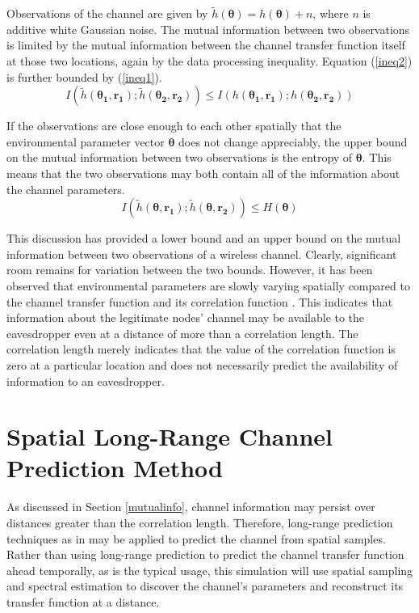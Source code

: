 \documentclass{allertonproc}
\begin{document}
Observations of the channel are given by $\tilde{h}(\boldsymbol{\theta})=h(\boldsymbol{\theta})+n$, where $n$ is additive white Gaussian noise.  The mutual information between two observations is limited by the mutual information between the channel transfer function itself at those two locations, again by the data processing inequality.  Equation (\ref{ineq2}) is further bounded by (\ref{ineq1}).
\begin{equation}\label{ineq2}
I(\tilde{h}(\boldsymbol{\theta_1},\mathbf{r_1}); \tilde{h}(\boldsymbol{\theta_2},\mathbf{r_2}))\leq I(h(\boldsymbol{\theta_1},\mathbf{r_1}); h(\boldsymbol{\theta_2},\mathbf{r_2}))
\end{equation}

If the observations are close enough to each other spatially that the environmental parameter vector $\boldsymbol{\theta}$ does not change appreciably, the upper bound on the mutual information between two observations is the entropy of $\boldsymbol{\theta}$.  This means that the two observations may both contain all of the information about the channel parameters.
\begin{equation}
I(\tilde{h}(\boldsymbol{\theta},\mathbf{r_1}); \tilde{h}(\boldsymbol{\theta},\mathbf{r_2}))\leq H(\boldsymbol{\theta})
\end{equation}

This discussion has provided a lower bound and an upper bound on the mutual information between two observations of a wireless channel.  Clearly, significant room remains for variation between the two bounds.  However, it has been observed that environmental parameters are slowly varying spatially compared to the channel transfer function and its correlation function \cite{jakes1974, duel-hallen2007}.  This indicates that information about the legitimate nodes' channel may be available to the eavesdropper even at a distance of more than a correlation length.   The correlation length merely indicates that the value of the correlation function is zero at a particular location and does not necessarily predict the availability of information to an eavesdropper. 

\section{Spatial Long-Range Channel Prediction Method}\label{prediction}
As discussed in Section \ref{mutualinfo}, channel information may persist over distances greater than the correlation length. Therefore, long-range prediction techniques as in \cite{duel-hallen2007} may be applied to predict the channel from spatial samples. Rather than using long-range prediction to predict the channel transfer function ahead temporally, as is the typical usage, this simulation will use spatial sampling and spectral estimation to discover the channel's parameters and reconstruct its transfer function at a distance.
\end{document}
